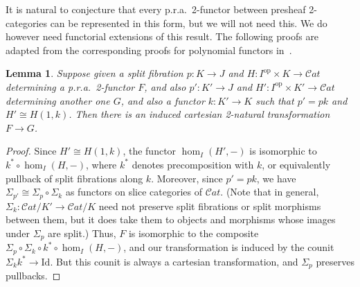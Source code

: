 \documentclass{article}
\newtheorem{lem}[thm]{Lemma}
\theoremstyle{definition}
\theoremstyle{remark}
\def\Cat{\ensuremath{\mathcal{C}\mathit{at}}}
\def\Id{\mathrm{Id}}
\def\op{^{\mathrm{op}}}
\begin{document}
It is natural to conjecture that every p.r.a.\ 2-functor between presheaf 2-categories can be represented in this form, but we will not need this.
We do however need functorial extensions of this result.
The following proofs are adapted from the corresponding proofs for polynomial functors in~\cite{kg:polynomials,weber:poly-pb}.

\begin{lem}\label{thm:pra2cell}
  Suppose given a split fibration $p:K\to J$ and $H:I\op \times K\to \Cat$ determining a p.r.a.\ 2-functor $F$, and also $p':K'\to J$ and $H':I\op\times K'\to\Cat$ determining another one $G$, and also a functor $k:K'\to K$ such that $p' = p k$ and $H' \cong H(1,k)$.
  Then there is an induced cartesian 2-natural transformation $F\to G$.
\end{lem}
\begin{proof}
  Since $H' \cong H(1,k)$, the functor $\hom_I(H',-)$ is isomorphic to $k^* \circ \hom_I(H,-)$, where $k^*$ denotes precomposition with $k$, or equivalently pullback of split fibrations along $k$.
  Moreover, since $p' = p k$, we have $\Sigma_{p'} \cong \Sigma_p \circ \Sigma_k$ as functors on slice categories of \Cat.
  (Note that in general, $\Sigma_k : \Cat/K' \to \Cat/K$ need not preserve split fibrations or split morphisms between them, but it does take them to objects and morphisms whose images under $\Sigma_p$ are split.)
  Thus, $F$ is isomorphic to the composite $\Sigma_p \circ \Sigma_k \circ k^* \circ \hom_I(H,-)$, and our transformation is induced by the counit $\Sigma_k k^* \to \Id$.
  But this counit is always a cartesian transformation, and $\Sigma_p$ preserves pullbacks.
\end{proof}
\end{document}
